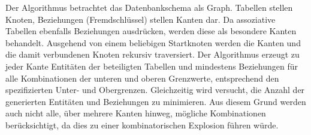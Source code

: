 	




Der Algorithmus betrachtet das Datenbankschema als Graph. 
%
Tabellen stellen Knoten, Beziehungen (Fremdschlüssel) stellen Kanten dar.
%
Da assoziative Tabellen ebenfalls Beziehungen ausdrücken, werden diese als besondere Kanten behandelt. 
%
%
Ausgehend von einem beliebigen Startknoten werden die Kanten und die damit verbundenen Knoten rekursiv traversiert.
%
Der Algorithmus erzeugt zu jeder Kante Entitäten der beteiligten Tabellen und mindestens Beziehungen für alle Kombinationen der unteren und oberen Grenzwerte, entsprechend den spezifizierten Unter- und Obergrenzen.
%
Gleichzeitig wird versucht, die Anzahl der generierten Entitäten und Beziehungen zu minimieren.
%
Aus diesem Grund werden auch nicht alle, über mehrere Kanten hinweg, mögliche Kombinationen berücksichtigt, da dies zu einer kombinatorischen Explosion führen würde.


